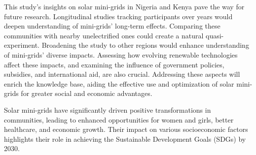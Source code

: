 This study's insights on solar mini-grids in Nigeria and Kenya pave the way for future research. Longitudinal studies tracking participants over years would deepen understanding of mini-grids' long-term effects. Comparing these communities with nearby unelectrified ones could create a natural quasi-experiment. Broadening the study to other regions would enhance understanding of mini-grids' diverse impacts. Assessing how evolving renewable technologies affect these impacts, and examining the influence of government policies, subsidies, and international aid, are also crucial. Addressing these aspects will enrich the knowledge base, aiding the effective use and optimization of solar mini-grids for greater social and economic advantages.

Solar mini-grids have significantly driven positive transformations in communities, leading to enhanced opportunities for women and girls, better healthcare, and economic growth. Their impact on various socioeconomic factors highlights their role in achieving the Sustainable Development Goals (SDGs) by 2030.